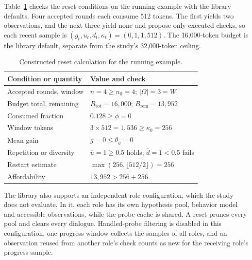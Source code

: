 \documentclass[a4paper,fleqn]{cas-sc}
\begin{document}
Table~\ref{tab:synthetic} checks the reset conditions on the running example with the library defaults. Four accepted rounds each consume 512 tokens. The first yields two observations, and the next three yield none and propose only executed checks, so each recent sample is $(g_t,u_t,d_t,\kappa_t)=(0,1,1,512)$. The 16,000-token budget is the library default, separate from the study's 32,000-token ceiling.

\begin{table}[pos=!htbp]
\caption{Constructed reset calculation for the running example.}\label{tab:synthetic}
\centering\small
\begin{tabular}{@{}p{}p{}@{}}\toprule
Condition or quantity & Value and check\\\midrule
Accepted rounds, window & $n=4\ge n_0=4$; $|\Omega|=3=W$\\
Budget total, remaining & $B_{\mathrm{tot}}=16{,}000$; $B_{\mathrm{rem}}=13{,}952$\\
Consumed fraction & $0.128\ge\phi=0$\\
Window tokens & $3\times512=1{,}536\ge\kappa_0=256$\\
Mean gain & $\bar g=0\le\theta_g=0$\\
Repetition or diversity & $\bar u=1\ge0.5$ holds; $\bar d=1<0.5$ fails\\
Restart estimate & $\max(256,\lfloor512/2\rfloor)=256$\\
Affordability & $13{,}952>256+256$\\
\bottomrule\end{tabular}
\end{table}

The library also supports an independent-role configuration, which the study does not evaluate. In it, each role has its own hypothesis pool, behavior model and accessible observations, while the probe cache is shared. A reset prunes every pool and clears every dialogue. Handled-probe filtering is disabled in this configuration, one progress window collects the samples of all roles, and an observation reused from another role's check counts as new for the receiving role's progress sample.
\end{document}
